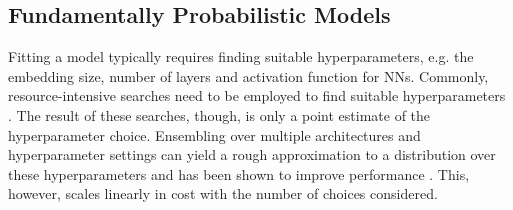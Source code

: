 \documentclass{article}
\begin{document}
\subsection{Fundamentally Probabilistic Models}
\label{sec:probabilistic prior}
Fitting a model typically requires finding suitable hyperparameters, e.g. the embedding size, number of layers and activation function for NNs. Commonly, resource-intensive searches need to be employed to find suitable hyperparameters \citep{liu-eccv18a,zoph-iclr17a,feurer-automlbook19a}.
The result of these searches, though, is only a point estimate of the hyperparameter choice.
Ensembling over multiple architectures and hyperparameter settings can yield a rough approximation to a distribution over these hyperparameters and has been shown to improve performance \citep{zaidi-neurips21a,hyperensemble}.
This, however, scales linearly in cost with the number of choices considered.
\end{document}
